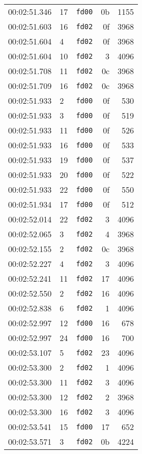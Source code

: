 \documentclass{article}
\begin{document}
\begin{longtable}{lllrr}
00:02:51.346 & 17 & \texttt{fd00} & 0b & 1155 \\
00:02:51.603 & 16 & \texttt{fd02} & 0f & 3968 \\
00:02:51.604 & 4 & \texttt{fd02} & 0f & 3968 \\
00:02:51.604 & 10 & \texttt{fd02} & 3 & 4096 \\
00:02:51.708 & 11 & \texttt{fd02} & 0c & 3968 \\
00:02:51.709 & 16 & \texttt{fd02} & 0c & 3968 \\
00:02:51.933 & 2 & \texttt{fd00} & 0f & 530 \\
00:02:51.933 & 3 & \texttt{fd00} & 0f & 519 \\
00:02:51.933 & 11 & \texttt{fd00} & 0f & 526 \\
00:02:51.933 & 16 & \texttt{fd00} & 0f & 533 \\
00:02:51.933 & 19 & \texttt{fd00} & 0f & 537 \\
00:02:51.933 & 20 & \texttt{fd00} & 0f & 522 \\
00:02:51.933 & 22 & \texttt{fd00} & 0f & 550 \\
00:02:51.934 & 17 & \texttt{fd00} & 0f & 512 \\
00:02:52.014 & 22 & \texttt{fd02} & 3 & 4096 \\
00:02:52.065 & 3 & \texttt{fd02} & 4 & 3968 \\
00:02:52.155 & 2 & \texttt{fd02} & 0c & 3968 \\
00:02:52.227 & 4 & \texttt{fd02} & 3 & 4096 \\
00:02:52.241 & 11 & \texttt{fd02} & 17 & 4096 \\
00:02:52.550 & 2 & \texttt{fd02} & 16 & 4096 \\
00:02:52.838 & 6 & \texttt{fd02} & 1 & 4096 \\
00:02:52.997 & 12 & \texttt{fd00} & 16 & 678 \\
00:02:52.997 & 24 & \texttt{fd00} & 16 & 700 \\
00:02:53.107 & 5 & \texttt{fd02} & 23 & 4096 \\
00:02:53.300 & 2 & \texttt{fd02} & 1 & 4096 \\
00:02:53.300 & 11 & \texttt{fd02} & 3 & 4096 \\
00:02:53.300 & 12 & \texttt{fd02} & 2 & 3968 \\
00:02:53.300 & 16 & \texttt{fd02} & 3 & 4096 \\
00:02:53.541 & 15 & \texttt{fd00} & 17 & 652 \\
00:02:53.571 & 3 & \texttt{fd02} & 0b & 4224 \\

\end{longtable}
\end{document}
